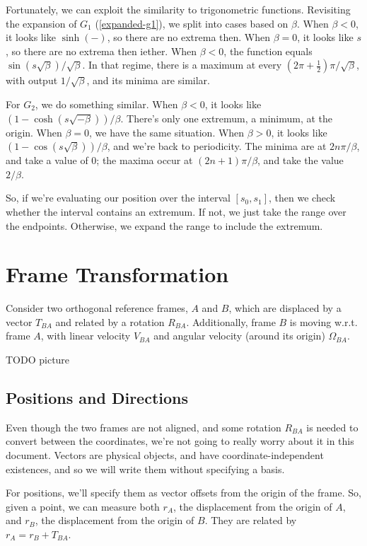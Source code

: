 \documentclass{article}
\numberwithin{equation}{subsection}
\begin{document}
Fortunately, we can exploit the similarity to trigonometric functions. Revisiting the expansion of $G_1$ (\ref{expanded-g1}), we split into cases based on $\beta$. When $\beta < 0$, it looks like $\sinh(-)$, so there are no extrema then. When $\beta = 0$, it looks like $s$, so there are no extrema then iether. When $\beta < 0$, the function equals $\sin(s \sqrt \beta) / \sqrt \beta$. In that regime, there is a maximum at every $\left( 2\pi + \frac{1}{2} \right) \pi / \sqrt \beta$, with output $1/\sqrt \beta$, and its minima are similar.

For $G_2$, we do something similar. When $\beta < 0$, it looks like $(1 - \cosh(s \sqrt{-\beta})) / \beta$. There's only one extremum, a minimum, at the origin. When $\beta = 0$, we have the same situation. When $\beta > 0$, it looks like $(1 - \cos(s \sqrt \beta)) / \beta$, and we're back to periodicity. The minima are at $2n\pi / \beta$, and take a value of $0$; the maxima occur at $(2n+1)\pi/\beta$, and take the value $2/\beta$.

So, if we're evaluating our position over the interval $[s_0, s_1]$, then we check whether the interval contains an extremum. If not, we just take the range over the endpoints. Otherwise, we expand the range to include the extremum.


\section{Frame Transformation}
Consider two orthogonal reference frames, $A$ and $B$, which are displaced by a vector $T_{BA}$ and related by a rotation $R_{BA}$. Additionally, frame $B$ is moving w.r.t. frame $A$, with linear velocity $V_{BA}$ and angular velocity (around its origin) $\Omega_{BA}$.

TODO picture

\subsection{Positions and Directions}

Even though the two frames are not aligned, and some rotation $R_{BA}$ is needed to convert between the coordinates, we're not going to really worry about it in this document. Vectors are physical objects, and have coordinate-independent existences, and so we will write them without specifying a basis.

For positions, we'll specify them as vector offsets from the origin of the frame. So, given a point, we can measure both $r_A$, the displacement from the origin of $A$, and $r_B$, the displacement from the origin of $B$. They are related by $r_A = r_B + T_{BA}$.
\end{document}

